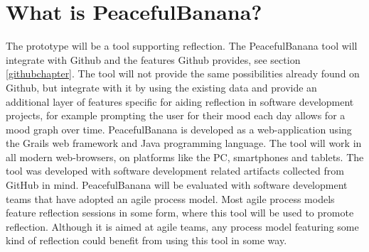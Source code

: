 \section{What is PeacefulBanana?}
The prototype will be a tool supporting reflection. The PeacefulBanana tool will integrate with Github and the features Github provides, see section \ref{githubchapter}. The tool will not provide the same possibilities already found on Github, but integrate with it by using the existing data and provide an additional layer of features specific for aiding reflection in software development projects, for example prompting the user for their mood each day allows for a mood graph over time. PeacefulBanana is developed as a web-application using the Grails web framework and Java programming language. The tool will work in all modern web-browsers, on platforms like the PC, smartphones and tablets. 
The tool was developed with software development related artifacts collected from GitHub in mind. PeacefulBanana will be evaluated with software development teams that have adopted an agile process model. Most agile process models feature reflection sessions in some form, where this tool will be used to promote reflection. Although it is aimed at agile teams, any process model featuring some kind of reflection could benefit from using this tool in some way.  

